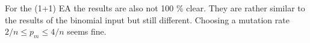 For the (1+1) EA the results are also not 100 \% clear.
They are rather similar to the results of the binomial input but still different.
Choosing a mutation rate $2/n \le p_m \le 4/n$ seems fine.